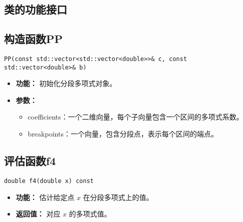 \documentclass[a4paper]{article}
\begin{document}
\subsection{类的功能接口}

\subsection{构造函数PP}

\begin{verbatim}
PP(const std::vector<std::vector<double>>& c, const std::vector<double>& b)
\end{verbatim}

\begin{itemize}
    \item \textbf{功能：} 初始化分段多项式对象。
    \item \textbf{参数：} 
    \begin{itemize}
        \item coefficients：一个二维向量，每个子向量包含一个区间的多项式系数。
        \item breakpoints：一个向量，包含分段点，表示每个区间的端点。
    \end{itemize}
\end{itemize}

\subsection{评估函数f4}

\begin{verbatim}
double f4(double x) const
\end{verbatim}

\begin{itemize}
    \item \textbf{功能：} 估计给定点 \( x \) 在分段多项式上的值。
    \item \textbf{返回值：} 对应 \( x \) 的多项式值。
\end{itemize}
\end{document}

